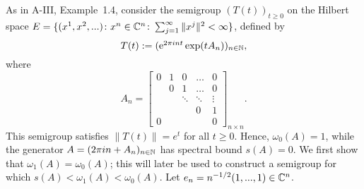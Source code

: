 \begin{example}\label{ex:a4-1.6} 
As in A-III, Example~1.4, consider the semigroup $ (T(t))_{t \geq 0} $ on the Hilbert space $ E = \{(x^1, x^2, ...) \colon x^n \in \mathbb{C}^n\colon\sum_{j=1}^{\infty} \|x^j\|^2 < \infty\} $, defined by 
\[\textstyle{
T(t) := (\mathrm{e}^{2\pi i n t} \exp(t A_n))_{n \in \mathbb{N}}
},\]
where
\[
A_n =
\begin{bmatrix}
0 & 1 & 0 & \dots & 0 \\
& 0 & 1 & \dots & 0 \\
& & \ddots & \ddots & \vdots \\
& & & 0 & 1 \\
0 & & & & 0
\end{bmatrix}_{n \times n}.
\]
This semigroup satisfies $ \|T(t)\| = e^t $ for all $t\ge 0$. Hence, $ \omega_{0}(A) = 1 $, while the generator $ A = (2\pi i n + A_n)_{n \in \mathbb{N}} $ has spectral bound $ s(A) = 0 $. 
We first show that $ \omega_1(A) = \omega_{0}(A) $; this will later be used to construct a semigroup for which $ s(A) < \omega_1(A) < \omega_{0}(A) $. 
Let $ e_n = n^{-1/2} (1, ..., 1) \in \mathbb{C}^n $. 


\end{example}
